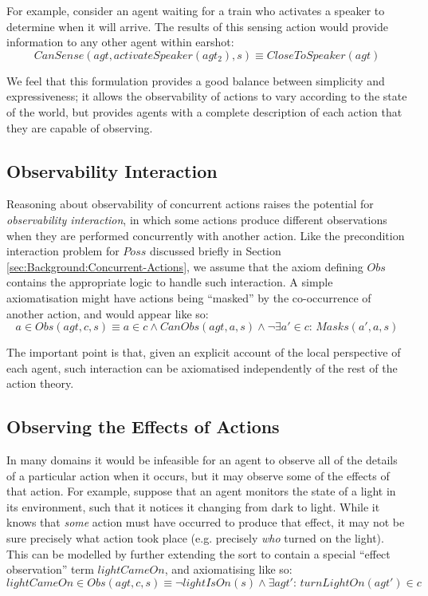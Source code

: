 For example, consider an agent waiting for a train who activates a
speaker to determine when it will arrive. The results of this sensing
action would provide information to any other agent within earshot:\[
CanSense(agt,activateSpeaker(agt_{2}),s)\equiv CloseToSpeaker(agt)\]


We feel that this formulation provides a good balance between simplicity
and expressiveness; it allows the observability of actions to vary
according to the state of the world, but provides agents with a complete
description of each action that they are capable of observing.


\subsection{Observability Interaction}

Reasoning about observability of concurrent actions raises the potential
for \emph{observability interaction}, in which some actions produce
different observations when they are performed concurrently with another
action. Like the precondition interaction problem for $Poss$ discussed
briefly in Section \ref{sec:Background:Concurrent-Actions}, we assume
that the axiom defining $Obs$ contains the appropriate logic to handle
such interaction. A simple axiomatisation might have actions being
{}``masked'' by the co-occurrence of another action, and would appear
like so:\[
a\in Obs(agt,c,s)\equiv a\in c\wedge CanObs(agt,a,s)\wedge\neg\exists a'\in c:\, Masks(a',a,s)\]


The important point is that, given an explicit account of the local
perspective of each agent, such interaction can be axiomatised independently
of the rest of the action theory.


\subsection{Observing the Effects of Actions}

In many domains it would be infeasible for an agent to observe all
of the details of a particular action when it occurs, but it may observe
some of the effects of that action. For example, suppose that an agent
monitors the state of a light in its environment, such that it notices
it changing from dark to light. While it knows that \emph{some} action
must have occurred to produce that effect, it may not be sure precisely
what action took place (e.g. precisely \emph{who} turned on the light).
This can be modelled by further extending the  sort
to contain a special {}``effect observation'' term $lightCameOn$,
and axiomatising like so:\[
lightCameOn\in Obs(agt,c,s)\equiv\neg lightIsOn(s)\wedge\exists agt':\, turnLightOn(agt')\in c\]


